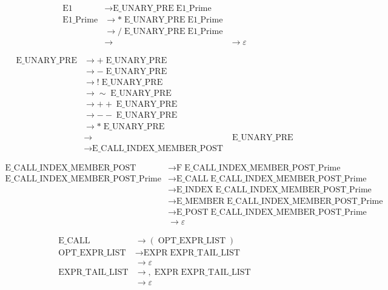 \begin{align*}
\text{E1}
  &\to \text{E\_UNARY\_PRE}\;\text{E1\_Prime}\\[6pt]
\text{E1\_Prime}
  &\to *\;\text{E\_UNARY\_PRE}\;\text{E1\_Prime}\\
  &\to /\;\text{E\_UNARY\_PRE}\;\text{E1\_Prime}\\
  &\to %
  &\to \varepsilon
\end{align*}

\begin{align*}
\text{E\_UNARY\_PRE}
  &\to +\;\text{E\_UNARY\_PRE}\\
  &\to -\;\text{E\_UNARY\_PRE}\\
  &\to !\;\text{E\_UNARY\_PRE}\\
  &\to \sim\;\text{E\_UNARY\_PRE}\\
  &\to ++\;\text{E\_UNARY\_PRE}\\
  &\to --\;\text{E\_UNARY\_PRE}\\
  &\to *\;\text{E\_UNARY\_PRE}\\
  &\to &\;\text{E\_UNARY\_PRE}\\
  &\to \text{E\_CALL\_INDEX\_MEMBER\_POST}
\end{align*}

\begin{align*}
\text{E\_CALL\_INDEX\_MEMBER\_POST}
  &\to \text{F}\;\text{E\_CALL\_INDEX\_MEMBER\_POST\_Prime}\\[6pt]
\text{E\_CALL\_INDEX\_MEMBER\_POST\_Prime}
  &\to \text{E\_CALL}\;\text{E\_CALL\_INDEX\_MEMBER\_POST\_Prime}\\
  &\to \text{E\_INDEX}\;\text{E\_CALL\_INDEX\_MEMBER\_POST\_Prime}\\
  &\to \text{E\_MEMBER}\;\text{E\_CALL\_INDEX\_MEMBER\_POST\_Prime}\\
  &\to \text{E\_POST}\;\text{E\_CALL\_INDEX\_MEMBER\_POST\_Prime}\\
  &\to \varepsilon
\end{align*}

\begin{align*}
\text{E\_CALL}
  &\to (\;\text{OPT\_EXPR\_LIST}\;)\\[6pt]
\text{OPT\_EXPR\_LIST}
  &\to \text{EXPR}\;\text{EXPR\_TAIL\_LIST}\\
  &\to \varepsilon\\[6pt]
\text{EXPR\_TAIL\_LIST}
  &\to ,\;\text{EXPR}\;\text{EXPR\_TAIL\_LIST}\\
  &\to \varepsilon
\end{align*}

